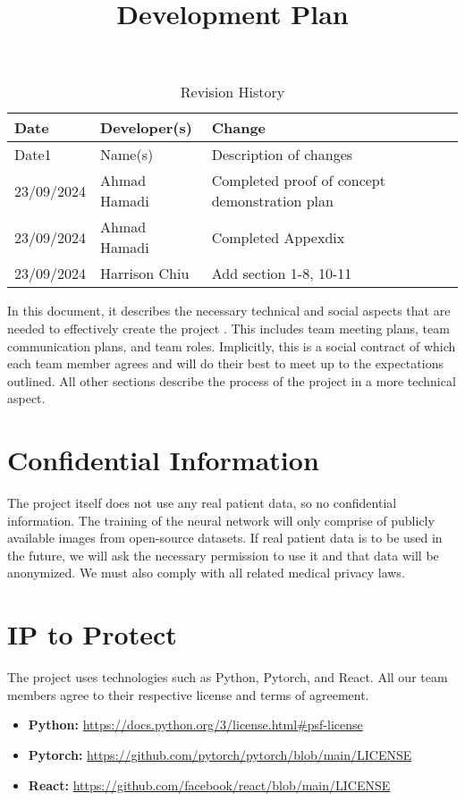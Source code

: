 \documentclass{article}
\title{Development Plan\\\progname}
\author{\authname}
\date{}
\begin{document}
\maketitle

\begin{table}[hp]
\caption{Revision History} \label{TblRevisionHistory}
\begin{tabularx}{\textwidth}{llX}
\toprule
\textbf{Date} & \textbf{Developer(s)} & \textbf{Change}\\
\midrule
Date1 & Name(s) & Description of changes\\
23/09/2024 & Ahmad Hamadi & Completed proof of concept demonstration plan\\
23/09/2024 & Ahmad Hamadi & Completed Appexdix\\
23/09/2024 & Harrison Chiu & Add section 1-8, 10-11\\
\bottomrule
\end{tabularx}
\end{table}

\newpage{}

In this document, it describes the necessary technical and social aspects that are needed to 
effectively create the project \progname. This includes team meeting plans, team communication
plans, and team roles. Implicitly, this is a social contract of which each team member agrees
and will do their best to meet up to the expectations outlined.
All other sections describe the process of the project in a more technical aspect.


\section{Confidential Information}

The project itself does not use any real patient data, so no confidential information.
The training of the neural network will only comprise of publicly available images from 
open-source datasets. If real patient data is to be used in the future, we will ask the necessary 
permission to use it and that data will be anonymized. We must also comply with all related 
medical privacy laws.

\section{IP to Protect}

The project uses technologies such as Python, Pytorch, and React. All our team members agree
to their respective license and terms of agreement.
\begin{itemize}
\item \textbf{Python:} \url{https://docs.python.org/3/license.html#psf-license}
\item \textbf{Pytorch:} \url{https://github.com/pytorch/pytorch/blob/main/LICENSE}
\item \textbf{React:} \url{https://github.com/facebook/react/blob/main/LICENSE}
\end{itemize}
\end{document}
